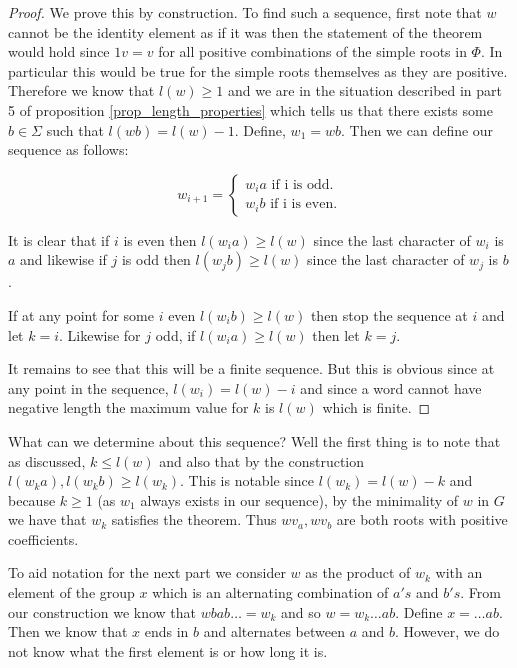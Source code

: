 \documentclass[a4paper,12pt]{article}
\begin{document}
\begin{proof}
	We prove this by construction. To find such a sequence, first note that $w$ cannot be the identity element as if it was then the statement of the theorem would hold since $1v = v$ for all positive combinations of the simple roots in $\Phi$. In particular this would be true for the simple roots themselves as they are positive. Therefore we know that $l(w) \geq 1$ and we are in the situation described in part 5 of proposition \ref{prop_length_properties} which tells us that there exists some $b \in \Sigma$ such that $l(wb) = l(w) - 1$. Define, $w_1 = wb$.
	Then we can define our sequence as follows:
	
	\begin{equation*}
		w_{i+1} =
		\begin{cases}
			w_ia \text{   if i is odd.} \\
			w_ib \text{   if i is even.}
		\end{cases}
	\end{equation*}
	
	It is clear that if $i$ is even then $l(w_ia) \geq l(w)$ since the last character of $w_i$ is $a$ and likewise if $j$ is odd then $l(w_jb) \geq l(w)$ since the last character of $w_j$ is $b$.
	
	If at any point for some $i$ even $l(w_ib) \geq l(w)$ then stop the sequence at $i$ and let $k = i$. Likewise for $j$ odd, if $l(w_ia) \geq l(w)$ then let $k = j$.
	
	It remains to see that this will be a finite sequence. But this is obvious since at any point in the sequence, $l(w_i) = l(w) - i$ and since a word cannot have negative length the maximum value for $k$ is $l(w)$ which is finite.
\end{proof}

What can we determine about this sequence? Well the first thing is to note that as discussed, $k \leq l(w)$ and also that by the construction $l(w_ka), l(w_kb) \geq l(w_k)$. This is notable since $l(w_k) = l(w) - k$ and because $k \geq 1$ (as $w_1$ always exists in our sequence), by the minimality of $w$ in $G$ we have that $w_k$ satisfies the theorem. Thus $wv_a, wv_b$ are both roots with positive coefficients.

To aid notation for the next part we consider $w$ as the product of $w_k$ with an element of the group $x$ which is an alternating combination of $a's$ and $b's$. From our construction we know that $wbab\ldots = w_k$ and so $w = w_k\ldots ab$. Define $x = \ldots ab$. Then we know that $x$ ends in $b$ and alternates between $a$ and $b$. However, we do not know what the first element is or how long it is.
\end{document}
